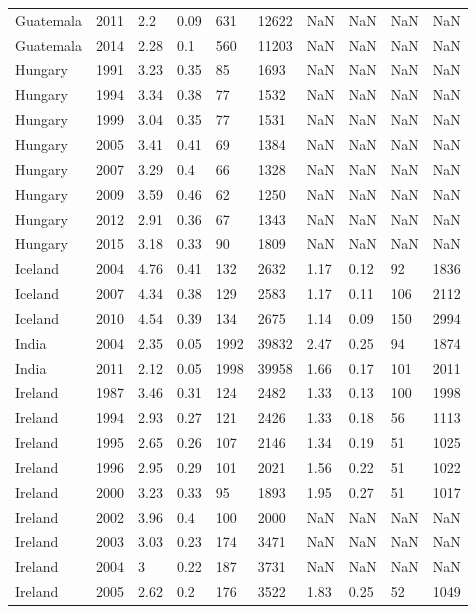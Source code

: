 \begin{tabular}{llllllllll}
Guatemala & 2011 & 2.2 & 0.09 & 631 & 12622 & NaN & NaN & NaN & NaN \\ 
Guatemala & 2014 & 2.28 & 0.1 & 560 & 11203 & NaN & NaN & NaN & NaN \\ 
Hungary & 1991 & 3.23 & 0.35 & 85 & 1693 & NaN & NaN & NaN & NaN \\ 
Hungary & 1994 & 3.34 & 0.38 & 77 & 1532 & NaN & NaN & NaN & NaN \\ 
Hungary & 1999 & 3.04 & 0.35 & 77 & 1531 & NaN & NaN & NaN & NaN \\ 
Hungary & 2005 & 3.41 & 0.41 & 69 & 1384 & NaN & NaN & NaN & NaN \\ 
Hungary & 2007 & 3.29 & 0.4 & 66 & 1328 & NaN & NaN & NaN & NaN \\ 
Hungary & 2009 & 3.59 & 0.46 & 62 & 1250 & NaN & NaN & NaN & NaN \\ 
Hungary & 2012 & 2.91 & 0.36 & 67 & 1343 & NaN & NaN & NaN & NaN \\ 
Hungary & 2015 & 3.18 & 0.33 & 90 & 1809 & NaN & NaN & NaN & NaN \\ 
Iceland & 2004 & 4.76 & 0.41 & 132 & 2632 & 1.17 & 0.12 & 92 & 1836 \\ 
Iceland & 2007 & 4.34 & 0.38 & 129 & 2583 & 1.17 & 0.11 & 106 & 2112 \\ 
Iceland & 2010 & 4.54 & 0.39 & 134 & 2675 & 1.14 & 0.09 & 150 & 2994 \\ 
India & 2004 & 2.35 & 0.05 & 1992 & 39832 & 2.47 & 0.25 & 94 & 1874 \\ 
India & 2011 & 2.12 & 0.05 & 1998 & 39958 & 1.66 & 0.17 & 101 & 2011 \\ 
Ireland & 1987 & 3.46 & 0.31 & 124 & 2482 & 1.33 & 0.13 & 100 & 1998 \\ 
Ireland & 1994 & 2.93 & 0.27 & 121 & 2426 & 1.33 & 0.18 & 56 & 1113 \\ 
Ireland & 1995 & 2.65 & 0.26 & 107 & 2146 & 1.34 & 0.19 & 51 & 1025 \\ 
Ireland & 1996 & 2.95 & 0.29 & 101 & 2021 & 1.56 & 0.22 & 51 & 1022 \\ 
Ireland & 2000 & 3.23 & 0.33 & 95 & 1893 & 1.95 & 0.27 & 51 & 1017 \\ 
Ireland & 2002 & 3.96 & 0.4 & 100 & 2000 & NaN & NaN & NaN & NaN \\ 
Ireland & 2003 & 3.03 & 0.23 & 174 & 3471 & NaN & NaN & NaN & NaN \\ 
Ireland & 2004 & 3 & 0.22 & 187 & 3731 & NaN & NaN & NaN & NaN \\ 
Ireland & 2005 & 2.62 & 0.2 & 176 & 3522 & 1.83 & 0.25 & 52 & 1049 \\ 

\end{tabular}
